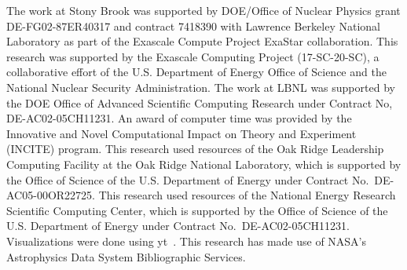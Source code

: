 \documentclass[a4paper]{jpconf}
\begin{document}
\ack The work at Stony Brook was supported by DOE/Office of Nuclear
Physics grant DE-FG02-87ER40317 and contract 7418390 with Lawrence
Berkeley National Laboratory as part of the Exascale Compute Project
ExaStar collaboration.  This research was supported by the Exascale
Computing Project (17-SC-20-SC), a collaborative effort of the
U.S. Department of Energy Office of Science and the National Nuclear
Security Administration.  The work at LBNL was supported by the DOE
Office of Advanced Scientific Computing Research under Contract No,
DE-AC02-05CH11231.  An award of computer time was provided by the
Innovative and Novel Computational Impact on Theory and Experiment
(INCITE) program. This research used resources of the Oak Ridge
Leadership Computing Facility at the Oak Ridge National Laboratory,
which is supported by the Office of Science of the U.S. Department of
Energy under Contract No.\ DE-AC05-00OR22725.  This research used
resources of the National Energy Research Scientific Computing Center,
which is supported by the Office of Science of the U.S. Department of
Energy under Contract No.\ DE-AC02-05CH11231.  Visualizations were
done using yt~\cite{yt}.  This research has made use of NASA's
Astrophysics Data System Bibliographic Services.





\end{document}
